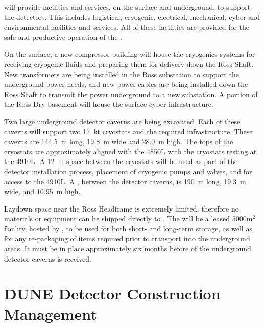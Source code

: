  will provide facilities and services, on the surface and
underground, to support the  detectors.  This includes
logistical, cryogenic, electrical, mechanical, cyber and environmental
facilities and services.  All of these facilities are provided for the
safe and productive operation of the .

On the surface, a new compressor building will house the cryogenics
systems for receiving cryogenic fluids and preparing them for delivery
down the Ross Shaft.  New transformers are being installed in the Ross substation to support the underground power needs, and new power cables are
being installed down the Ross Shaft to transmit the power underground
to a new substation.  A portion of the Ross Dry basement will house the
surface cyber infrastructure.


Two large underground detector caverns
are being excavated.  Each of these caverns will support two
\SI{17}{\kilo\tonne} cryostats and the required infrastructure.  These caverns are \SI{144.5}{\meter} long, \SI{19.8}{\meter} wide and
\SI{28.0}{\meter} high. The tops of the cryostats are approximately
aligned with the 4850L with the cryostats resting
at the 4910L.  A \SI{12}{\meter} space between the cryostats will
be used as part of the detector installation process, placement of
cryogenic pumps and valves, and for access to the 4910L.  A
, between the detector caverns, is \SI{190}{\meter}
long, \SI{19.3}{\meter} wide, and \SI{10.95}{\meter} high.

Laydown space near the Ross Headframe is extremely 
limited, therefore  no materials or equipment can be shipped directly to . The  will be a leased 5000m$^2$ facility, hosted by 
, to be used for both short- and long-term storage, as 
well as for any re-packaging of items required prior to transport 
into the underground areas.  It must be in place approximately six months before 
of the underground detector caverns is received.  

\section{DUNE Detector Construction Management}
\label{sec:es-tc-det-mgmt}


